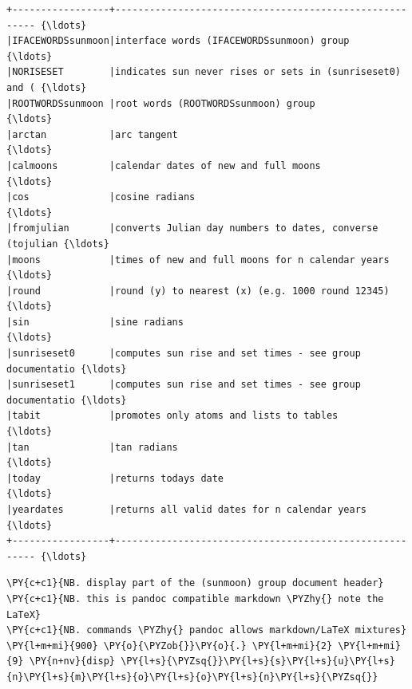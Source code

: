     \begin{Verbatim}[commandchars=\\\{\}]
+-----------------+-------------------------------------------------------- {\ldots}
|IFACEWORDSsunmoon|interface words (IFACEWORDSsunmoon) group                {\ldots}
|NORISESET        |indicates sun never rises or sets in (sunriseset0) and ( {\ldots}
|ROOTWORDSsunmoon |root words (ROOTWORDSsunmoon) group                      {\ldots}
|arctan           |arc tangent                                              {\ldots}
|calmoons         |calendar dates of new and full moons                     {\ldots}
|cos              |cosine radians                                           {\ldots}
|fromjulian       |converts Julian day numbers to dates, converse (tojulian {\ldots}
|moons            |times of new and full moons for n calendar years         {\ldots}
|round            |round (y) to nearest (x) (e.g. 1000 round 12345)         {\ldots}
|sin              |sine radians                                             {\ldots}
|sunriseset0      |computes sun rise and set times - see group documentatio {\ldots}
|sunriseset1      |computes sun rise and set times - see group documentatio {\ldots}
|tabit            |promotes only atoms and lists to tables                  {\ldots}
|tan              |tan radians                                              {\ldots}
|today            |returns todays date                                      {\ldots}
|yeardates        |returns all valid dates for n calendar years             {\ldots}
+-----------------+-------------------------------------------------------- {\ldots}
    \end{Verbatim}

    \begin{tcolorbox}[breakable, size=fbox, boxrule=1pt, pad at break*=1mm,colback=cellbackground, colframe=cellborder]
\begin{Verbatim}[commandchars=\\\{\}]
\PY{c+c1}{NB. display part of the (sunmoon) group document header}
\PY{c+c1}{NB. this is pandoc compatible markdown \PYZhy{} note the LaTeX}
\PY{c+c1}{NB. commands \PYZhy{} pandoc allows markdown/LaTeX mixtures}
\PY{l+m+mi}{900} \PY{o}{\PYZob{}}\PY{o}{.} \PY{l+m+mi}{2} \PY{l+m+mi}{9} \PY{n+nv}{disp} \PY{l+s}{\PYZsq{}}\PY{l+s}{s}\PY{l+s}{u}\PY{l+s}{n}\PY{l+s}{m}\PY{l+s}{o}\PY{l+s}{o}\PY{l+s}{n}\PY{l+s}{\PYZsq{}}
\end{Verbatim}
\end{tcolorbox}

